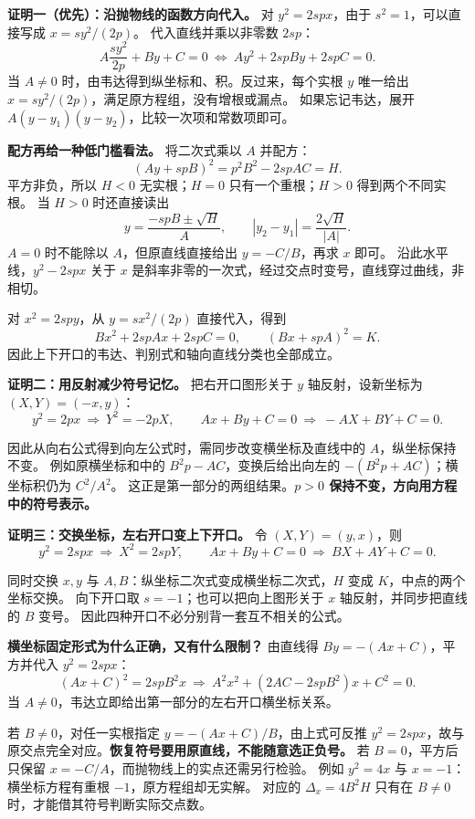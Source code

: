\begin{proofbox}
\textbf{证明一（优先）：沿抛物线的函数方向代入。}
对 $y^2=2spx$，由于 $s^2=1$，可以直接写成 $x=sy^2/(2p)$。
代入直线并乘以非零数 $2sp$：
\[
 A\frac{sy^2}{2p}+By+C=0
 \ \Longleftrightarrow\ Ay^2+2spBy+2spC=0.
\]
当 $A\ne0$ 时，由韦达得到纵坐标和、积。反过来，每个实根 $y$ 唯一给出 $x=sy^2/(2p)$，满足原方程组，没有增根或漏点。
如果忘记韦达，展开 $A(y-y_1)(y-y_2)$，比较一次项和常数项即可。

\textbf{配方再给一种低门槛看法。} 将二次式乘以 $A$ 并配方：
\[
 (Ay+spB)^2=p^2B^2-2spAC=H.
\]
平方非负，所以 $H<0$ 无实根；$H=0$ 只有一个重根；$H>0$ 得到两个不同实根。
当 $H>0$ 时还直接读出
\[
 y=\frac{-spB\pm\sqrt H}{A},\qquad
 |y_2-y_1|=\frac{2\sqrt H}{|A|}.
\]
$A=0$ 时不能除以 $A$，但原直线直接给出 $y=-C/B$，再求 $x$ 即可。
沿此水平线，$y^2-2spx$ 关于 $x$ 是斜率非零的一次式，经过交点时变号，直线穿过曲线，非相切。

对 $x^2=2spy$，从 $y=sx^2/(2p)$ 直接代入，得到
\[
 Bx^2+2spAx+2spC=0,\qquad (Bx+spA)^2=K.
\]
因此上下开口的韦达、判别式和轴向直线分类也全部成立。
\end{proofbox}
\clearpage
\begin{proofbox}
\textbf{证明二：用反射减少符号记忆。}
把右开口图形关于 $y$ 轴反射，设新坐标为 $(X,Y)=(-x,y)$：
\[
 y^2=2px\ \Longrightarrow\ Y^2=-2pX,\qquad
 Ax+By+C=0\ \Longrightarrow\ -AX+BY+C=0.
\]

因此从向右公式得到向左公式时，需同步改变横坐标及直线中的 $A$，纵坐标保持不变。
例如原横坐标和中的 $B^2p-AC$，变换后给出向左的 $-(B^2p+AC)$；横坐标积仍为 $C^2/A^2$。
这正是第一部分的两组结果。\textbf{$p>0$ 保持不变，方向用方程中的符号表示。}
\end{proofbox}
\clearpage
\begin{proofbox}
\textbf{证明三：交换坐标，左右开口变上下开口。}
令 $(X,Y)=(y,x)$，则
\[
 y^2=2spx\ \Longrightarrow\ X^2=2spY,\qquad
 Ax+By+C=0\ \Longrightarrow\ BX+AY+C=0.
\]

同时交换 $x,y$ 与 $A,B$：纵坐标二次式变成横坐标二次式，$H$ 变成 $K$，中点的两个坐标交换。
向下开口取 $s=-1$；也可以把向上图形关于 $x$ 轴反射，并同步把直线的 $B$ 变号。
因此四种开口不必分别背一套互不相关的公式。
\end{proofbox}
\clearpage
\begin{proofbox}
\textbf{横坐标固定形式为什么正确，又有什么限制？}
由直线得 $By=-(Ax+C)$，平方并代入 $y^2=2spx$：
\[
 (Ax+C)^2=2spB^2x
 \ \Longrightarrow\ A^2x^2+(2AC-2spB^2)x+C^2=0.
\]
当 $A\ne0$，韦达立即给出第一部分的左右开口横坐标关系。

若 $B\ne0$，对任一实根指定 $y=-(Ax+C)/B$，由上式可反推 $y^2=2spx$，故与原交点完全对应。\textbf{恢复符号要用原直线，不能随意选正负号。}
若 $B=0$，平方后只保留 $x=-C/A$，而抛物线上的实点还需另行检验。
例如 $y^2=4x$ 与 $x=-1$：横坐标方程有重根 $-1$，原方程组却无实解。
对应的 $\Delta_x=4B^2H$ 只有在 $B\ne0$ 时，才能借其符号判断实际交点数。
\end{proofbox}
